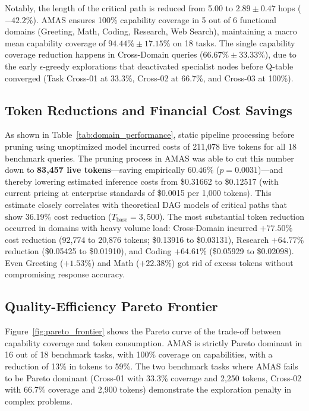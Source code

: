 ﻿\documentclass[conference]{IEEEtran}
\begin{document}
Notably, the length of the critical path is reduced from 5.00 to $\mathbf{2.89 \pm 0.47}$ hops ($-42.2\%$). AMAS ensures 100\% capability coverage in 5 out of 6 functional domains (Greeting, Math, Coding, Research, Web Search), maintaining a macro mean capability coverage of $\mathbf{94.44\% \pm 17.15\%}$ on 18 tasks. The single capability coverage reduction happens in Cross-Domain queries ($66.67\% \pm 33.33\%$), due to the early $\epsilon$-greedy explorations that deactivated specialist nodes before Q-table converged (Task Cross-01 at 33.3\%, Cross-02 at 66.7\%, and Cross-03 at 100\%).

\subsection{Token Reductions and Financial Cost Savings}
As shown in Table~\ref{tab:domain_performance}, static pipeline processing before pruning using unoptimized model incurred costs of 211,078 live tokens for all 18 benchmark queries. The pruning process in AMAS was able to cut this number down to \textbf{83,457 live tokens}---saving empirically $\mathbf{60.46\%}$ ($p=0.0031$)---and thereby lowering estimated inference costs from \$0.31662 to \$0.12517 (with current pricing at enterprise standards of \$0.0015 per 1,000 tokens). This estimate closely correlates with theoretical DAG models of critical paths that show 36.19\% cost reduction ($T_{\mathrm{base}} = 3,500$). The most substantial token reduction occurred in domains with heavy volume load: Cross-Domain incurred $+77.50\%$ cost reduction (92,774 to 20,876 tokens; \$0.13916 to \$0.03131), Research $+64.77\%$ reduction (\$0.05425 to \$0.01910), and Coding $+64.61\%$ (\$0.05929 to \$0.02098). Even Greeting ($+1.53\%$) and Math ($+22.38\%$) got rid of excess tokens without compromising response accuracy.

\subsection{Quality-Efficiency Pareto Frontier}
Figure~\ref{fig:pareto_frontier} shows the Pareto curve of the trade-off between capability coverage and token consumption. AMAS is strictly Pareto dominant in 16 out of 18 benchmark tasks, with 100\% coverage on capabilities, with a reduction of 13\% in tokens to 59\%. The two benchmark tasks where AMAS fails to be Pareto dominant (Cross-01 with 33.3\% coverage and 2,250 tokens, Cross-02 with 66.7\% coverage and 2,900 tokens) demonstrate the exploration penalty in complex problems.
\end{document}
